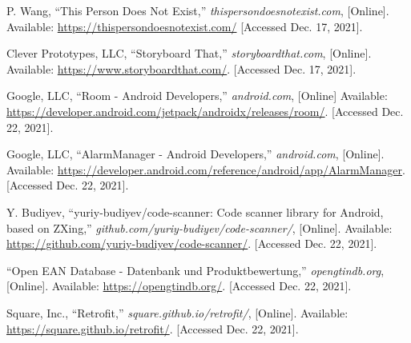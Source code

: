 \documentclass[conference]{IEEEtran}
\begin{document}
\newpage %
\begin{thebibliography}{00}	
	 P. Wang, ``This Person Does Not Exist,'' \textit{thispersondoesnotexist.com}, [Online]. Available: \url{https://thispersondoesnotexist.com/} [Accessed Dec. 17, 2021].

	 Clever Prototypes, LLC, ``Storyboard That,'' \textit{storyboardthat.com}, [Online]. Available: \url{https://www.storyboardthat.com/}. [Accessed Dec. 17, 2021].
	
	 Google, LLC, ``Room - Android Developers,'' \textit{android.com}, [Online] Available: \url{https://developer.android.com/jetpack/androidx/releases/room/}. [Accessed Dec. 22, 2021].
		
	 Google, LLC, ``AlarmManager - Android Developers,'' \textit{android.com}, [Online]. Available: \url{https://developer.android.com/reference/android/app/AlarmManager}. [Accessed Dec. 22, 2021].

	 Y. Budiyev, ``yuriy-budiyev/code-scanner: Code scanner library for Android, based on ZXing,'' \textit{github.com/yuriy-budiyev/code-scanner/}, [Online]. Available: \url{https://github.com/yuriy-budiyev/code-scanner/}. [Accessed Dec. 22, 2021].

	 ``Open EAN Database - Datenbank und Produktbewertung,'' \textit{opengtindb.org}, [Online]. Available: \url{https://opengtindb.org/}. [Accessed Dec. 22, 2021].
	
	 Square, Inc., ``Retrofit,'' \textit{square.github.io/retrofit/}, [Online]. Available: \url{https://square.github.io/retrofit/}. [Accessed Dec. 22, 2021].
\end{thebibliography}
\end{document}
